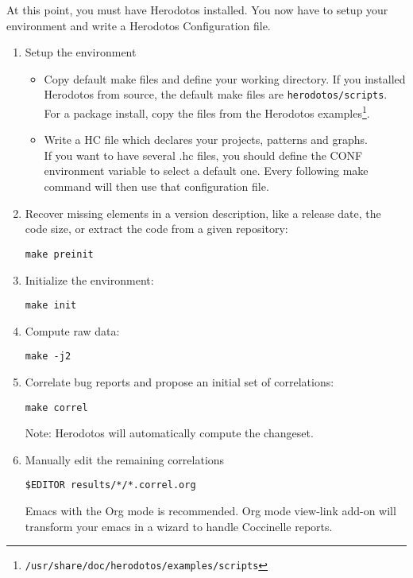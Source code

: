 
\label{chap:howto}

At this point, you must have Herodotos installed. You now have to
setup your environment and write a Herodotos Configuration file.



\begin{enumerate}
\item Setup the environment
  \begin{itemize}
  \item Copy default make files and define your working directory. If
    you installed Herodotos from source, the default make files are
    \texttt{herodotos/scripts}. For a package install, copy the files
    from the Herodotos
    examples\footnote{\texttt{/usr/share/doc/herodotos/examples/scripts}}.
  \item Write a HC file which declares your projects, patterns and graphs.\\
    If you want to have several .hc files, you should define the CONF
    environment variable to select a default one. Every following make
    command will then use that configuration file.
  \end{itemize}

\item Recover missing elements in a version description, like a release
  date, the code size, or extract the code from a given repository:

  \texttt{make preinit}
  
\item Initialize the environment:

  \texttt{make init}

  
  
\item Compute raw data:

  \texttt{make -j2}

\item Correlate bug reports and propose an initial set of
  correlations:

  \texttt{make correl}

  Note: Herodotos will automatically compute the changeset.

\item Manually edit the remaining correlations

  \texttt{\$EDITOR results/*/*.correl.org}

  Emacs with the Org mode is recommended.
  Org mode view-link add-on will transform your
  emacs in a wizard to handle Coccinelle reports.


\end{enumerate}
